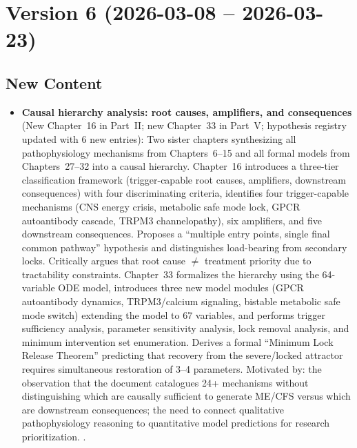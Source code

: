 \section*{Version 6 (2026-03-08 -- 2026-03-23)}

\subsection*{New Content}

\begin{itemize}

  \item \textbf{Causal hierarchy analysis: root causes, amplifiers, and consequences}
    (New Chapter~16 in Part~II; new Chapter~33 in Part~V; hypothesis registry
    updated with 6 new entries):
    Two sister chapters synthesizing all pathophysiology mechanisms from Chapters~6--15
    and all formal models from Chapters~27--32 into a causal hierarchy. Chapter~16
    introduces a three-tier classification framework (trigger-capable root causes,
    amplifiers, downstream consequences) with four discriminating criteria, identifies
    four trigger-capable mechanisms (CNS energy crisis, metabolic safe mode lock,
    GPCR autoantibody cascade, TRPM3 channelopathy), six amplifiers, and five
    downstream consequences. Proposes a ``multiple entry points, single final common
    pathway'' hypothesis and distinguishes load-bearing from secondary locks.
    Critically argues that root cause $\neq$ treatment priority due to tractability
    constraints. Chapter~33 formalizes the hierarchy using the 64-variable ODE model,
    introduces three new model modules (GPCR autoantibody dynamics, TRPM3/calcium
    signaling, bistable metabolic safe mode switch) extending the model to 67
    variables, and performs trigger sufficiency analysis, parameter sensitivity
    analysis, lock removal analysis, and minimum intervention set enumeration.
    Derives a formal ``Minimum Lock Release Theorem'' predicting that recovery from
    the severe/locked attractor requires simultaneous restoration of 3--4 parameters.
    Motivated by: the observation that the document catalogues 24+ mechanisms without
    distinguishing which are causally sufficient to generate ME/CFS versus which are
    downstream consequences; the need to connect qualitative pathophysiology reasoning
    to quantitative model predictions for research prioritization.
    \cite{Walitt2024NIH,Nakatomi2014neuroinflammation,Loebel2016,Sotzny2021,%
    Stein2024immunoadsorption,Fluge2025daratumumab,Sasso2026trpm3}.


\end{itemize}
